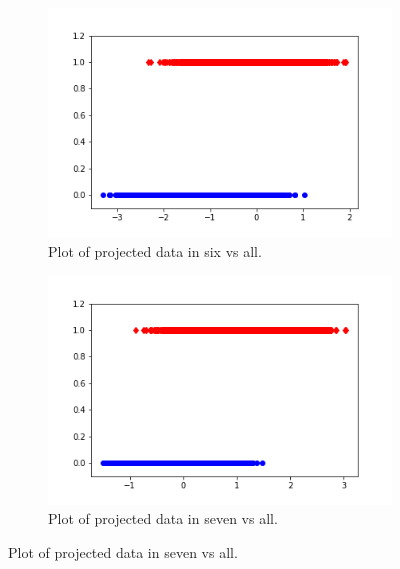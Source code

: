 \documentclass[12pt]{article}%
\numberwithin{equation}{subsection}
\begin{document}
\begin{figure}[H]
    \begin{subfigure}[b]{0.5\linewidth}
        \centering
        \includegraphics[width=\linewidth]{images/fig6.png}
        \caption{Plot of projected data in six vs all.}
        \label{fig3:a}
        \vspace{4ex}
    \end{subfigure}%
    \begin{subfigure}[b]{0.5\linewidth}
        \centering
        \includegraphics[width=\linewidth]{images/fig7.png}
        \caption{Plot of projected data in seven vs all.}
        \label{fig3:b}
        \vspace{4ex}
    \end{subfigure}



\end{figure}
\end{document}
